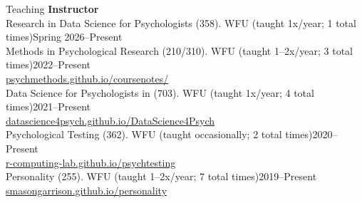 \begin{rSection}{\textrm{Teaching}}
\vspace*{2pt}
{\large  \bf Instructor}\\
Research in Data Science for Psychologists (358). WFU {\small(taught 1x/year; 1 total times)}\hfill{Spring 2026--Present}\\
Methods in Psychological Research (210/310). WFU {\small(taught 1--2x/year; 3 total times)}\hfill{2022--Present}\\
\hspace*{6 mm} \href{https://psychmethods.github.io/coursenotes/}{\color{blue} psychmethods.github.io/coursenotes/}\smallskip\\
Data Science for Psychologists in \R (703). WFU {\small(taught 1x/year; 4 total times)}\hfill{2021--Present}\\
\hspace*{6 mm} \href{https://datascience4psych.github.io/DataScience4Psych/}{\color{blue} datascience4psych.github.io/DataScience4Psych}\smallskip\\
Psychological Testing (362). WFU {\small(taught occasionally; 2 total times)}\hfill{2020--Present}\\
\hspace*{6 mm} \href{https://r-computing-lab.github.io/psychtesting/}{\color{blue} r-computing-lab.github.io/psychtesting}\smallskip\\
Personality (255). WFU  {\small(taught 1--2x/year; 7 total times)}\hfill{2019--Present}\\
\hspace*{6 mm} \href{https://smasongarrison.github.io/personality/}{\color{blue} smasongarrison.github.io/personality} \smallskip\\
\begin{comment}
Methods in Psychological Research (210/310). Wake Forest University \hfill{Spring 2022; Fall 2024, \textit{Fall 2025}}\\

\end{comment}
\end{rSection}
